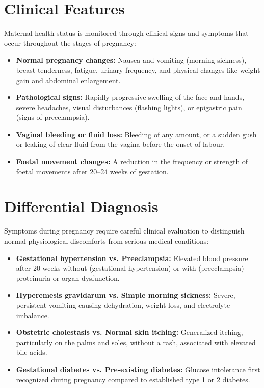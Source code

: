\section*{Clinical Features}
Maternal health status is monitored through clinical signs and symptoms that occur throughout the stages of pregnancy:

\begin{itemize}
    \item \textbf{Normal pregnancy changes:} Nausea and vomiting (morning sickness), breast tenderness, fatigue, urinary frequency, and physical changes like weight gain and abdominal enlargement.
    \item \textbf{Pathological signs:} Rapidly progressive swelling of the face and hands, severe headaches, visual disturbances (flashing lights), or epigastric pain (signs of preeclampsia).
    \item \textbf{Vaginal bleeding or fluid loss:} Bleeding of any amount, or a sudden gush or leaking of clear fluid from the vagina before the onset of labour.
    \item \textbf{Foetal movement changes:} A reduction in the frequency or strength of foetal movements after 20--24 weeks of gestation.
\end{itemize}

\section*{Differential Diagnosis}
Symptoms during pregnancy require careful clinical evaluation to distinguish normal physiological discomforts from serious medical conditions:

\begin{itemize}
    \item \textbf{Gestational hypertension vs. Preeclampsia:} Elevated blood pressure after 20 weeks without (gestational hypertension) or with (preeclampsia) proteinuria or organ dysfunction.
    \item \textbf{Hyperemesis gravidarum vs. Simple morning sickness:} Severe, persistent vomiting causing dehydration, weight loss, and electrolyte imbalance.
    \item \textbf{Obstetric cholestasis vs. Normal skin itching:} Generalized itching, particularly on the palms and soles, without a rash, associated with elevated bile acids.
    \item \textbf{Gestational diabetes vs. Pre-existing diabetes:} Glucose intolerance first recognized during pregnancy compared to established type 1 or 2 diabetes.
\end{itemize}


